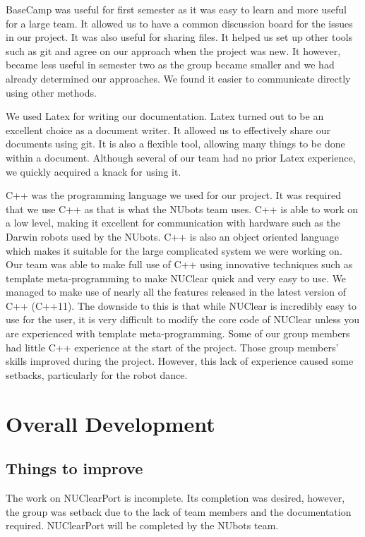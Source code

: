 \documentclass[english,12pt]{scrartcl}
\begin{document}
		BaseCamp was useful for first semester as it was easy to learn and more useful for a large team.
		It allowed us to have a common discussion board for the issues in our project.
		It was also useful for sharing files.
		It helped us set up other tools such as git and agree on our approach when the project was new.
		It however, became less useful in semester two as the group became smaller and we had already determined our approaches.
		We found it easier to communicate directly using other methods.

		We used Latex for writing our documentation.
		Latex turned out to be an excellent choice as a document writer.
		It allowed us to effectively share our documents using git.
		It is also a flexible tool, allowing many things to be done within a document.
		Although several of our team had no prior Latex experience, we quickly acquired a knack for using it.

		C++ was the programming language we used for our project.
		It was required that we use C++ as that is what the NUbots team uses.
		C++ is able to work on a low level, making it excellent for communication with hardware such as the Darwin robots used by the NUbots.
		C++ is also an object oriented language which makes it suitable for the large complicated system we were working on.
		Our team was able to make full use of C++ using innovative techniques such as template meta-programming to make NUClear quick and very easy to use.
		We managed to make use of nearly all the features released in the latest version of C++ (C++11).
		The downside to this is that while NUClear is incredibly easy to use for the user, it is very difficult to modify the core code of NUClear unless you are experienced with template meta-programming.
		Some of our group members had little C++ experience at the start of the project.
		Those group members’ skills improved during the project.
		However, this lack of experience caused some setbacks, particularly for the robot dance.
		
\section{Overall Development}
	\subsection{Things to improve}
		The work on NUClearPort is incomplete.
		Its completion was desired, however, the group was setback due to the lack of team members and the documentation required.
		NUClearPort will be completed by the NUbots team.
		
\end{document}
